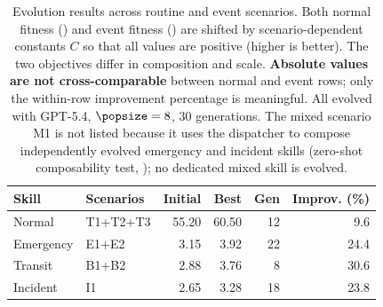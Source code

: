 \begin{table}[t]
\centering
\caption{Evolution results across routine and event scenarios. Both normal fitness () and event fitness () are shifted by scenario-dependent constants $C$ so that all values are positive (higher is better). The two objectives differ in composition and scale. \textbf{Absolute values are not cross-comparable} between normal and event rows; only the within-row improvement percentage is meaningful. All evolved with GPT-5.4, $\popsize=8$, 30 generations. The mixed scenario M1 is not listed because it uses the dispatcher to compose independently evolved emergency and incident skills (zero-shot composability test, ); no dedicated mixed skill is evolved.}
\label{tab:main_results}
\begin{tabular}{llrrrr}
\toprule
Skill & Scenarios & Initial & Best & Gen & Improv. (\%) \\
\midrule
Normal & T1+T2+T3 & 55.20 & 60.50 & 12 & 9.6 \\
\midrule
Emergency & E1+E2 & 3.15 & 3.92 & 22 & 24.4 \\
Transit & B1+B2 & 2.88 & 3.76 & 8 & 30.6 \\
Incident & I1 & 2.65 & 3.28 & 18 & 23.8 \\
\bottomrule
\end{tabular}
\end{table}
